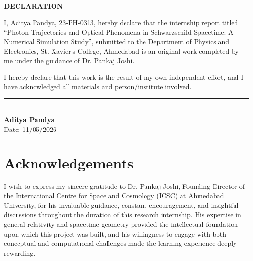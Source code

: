 \documentclass[12pt,a4paper]{article}
\begin{document}
\clearpage
\pagestyle{plain}

\begin{center}
    \Large\textbf{DECLARATION}
\end{center}

\vspace{1cm}

I, Aditya Pandya, 23-PH-0313, hereby declare that the internship report titled ``Photon Trajectories and Optical Phenomena in Schwarzschild Spacetime: A Numerical Simulation Study'', submitted to the Department of Physics and Electronics, St. Xavier's College, Ahmedabad is an original work completed by me under the guidance of Dr. Pankaj Joshi.

\vspace{0.5cm}

I hereby declare that this work is the result of my own independent effort, and I have acknowledged all materials and person/institute involved.

\vspace{3cm}

\begin{flushright}
    \rule{6cm}{0.5pt} \\ %
    \vspace{0.2cm}
    \textbf{Aditya Pandya} \\
    Date: 11/05/2026
\end{flushright}
\clearpage

\section*{Acknowledgements}

\vspace{\baselineskip}
I wish to express my sincere gratitude to Dr. Pankaj Joshi, Founding Director of the International Centre for Space and Cosmology (ICSC) at Ahmedabad University, for his invaluable guidance, constant encouragement, and insightful discussions throughout the duration of this research internship. His expertise in general relativity and spacetime geometry provided the intellectual foundation upon which this project was built, and his willingness to engage with both conceptual and computational challenges made the learning experience deeply rewarding.
\end{document}
